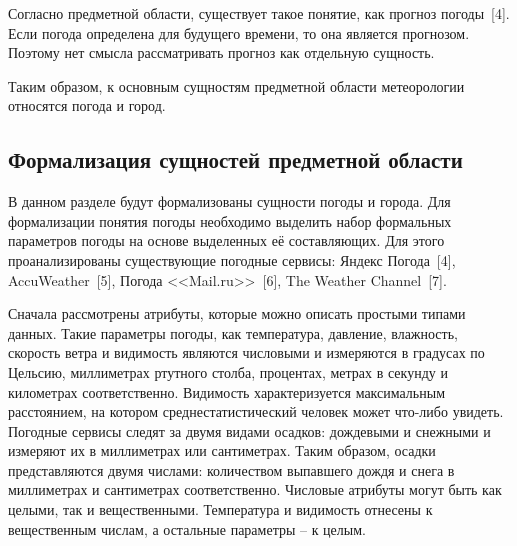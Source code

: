 Согласно предметной области, существует такое понятие, как прогноз погоды~[4].
Если погода определена для будущего времени, то она является прогнозом.
Поэтому нет смысла рассматривать прогноз как отдельную сущность.

Таким образом, к основным сущностям предметной области метеорологии относятся погода и город.

\subsection{Формализация сущностей предметной области}
В данном разделе будут формализованы сущности погоды и города.
Для формализации понятия погоды необходимо выделить набор формальных параметров погоды на основе выделенных её составляющих.
Для этого проанализированы существующие погодные сервисы: Яндекс Погода~[4], AccuWeather~[5], Погода <<Mail.ru>>~[6], The Weather Channel~[7].

Сначала рассмотрены атрибуты, которые можно описать простыми типами данных.
Такие параметры погоды, как температура, давление, влажность, скорость ветра и видимость являются числовыми и измеряются в градусах по Цельсию, миллиметрах ртутного столба, процентах, метрах в секунду и километрах соответственно.
Видимость характеризуется максимальным расстоянием, на котором среднестатистический человек может что-либо увидеть.
Погодные сервисы следят за двумя видами осадков: дождевыми и снежными и измеряют их в миллиметрах или сантиметрах.
Таким образом, осадки представляются двумя числами: количеством выпавшего дождя и снега в миллиметрах и сантиметрах соответственно.
Числовые атрибуты могут быть как целыми, так и вещественными.
Температура и видимость отнесены к вещественным числам, а остальные параметры -- к целым.

